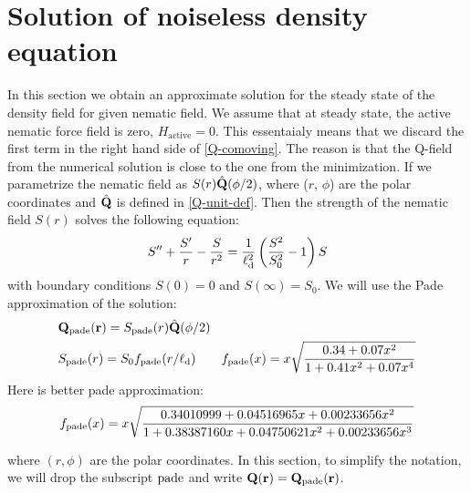 \documentclass[a5paper]{article}
\begin{document}
\section{Solution of noiseless density equation}
\label{sec:defect-steady-poisson}
In this section we obtain an approximate solution for the steady state of the density field for given nematic field. We assume that at steady state, the active nematic force field is zero, $H_\text{active} = 0$. This essentaialy means that we discard the first term in the right hand side of \cref{Q-comoving}. The reason is that the Q-field from the numerical solution is close to the one from the minimization.
If we parametrize the nematic field as $S(r) \hat{\mathbf{Q}}(\phi/2)$, where ($r$, $\phi$) are the polar coordinates and $\hat{\mathbf{Q}}$ is defined in \cref{Q-unit-def}.
Then the strength of the nematic field $S(r)$ solves the following equation:
\begin{align}
S''+\frac{S'}{r}-\frac{S}{r^2} = \frac{1}{\ell_{\rm d}^2}\left(\frac{S^2}{S_0^2}-1\right)S
\end{align}
with boundary conditions $S(0) = 0$ and $S(\infty) = S_0$.
We will use the Pade approximation of the solution:
\begin{align}
    &\mathbf{Q}_{\text{pade}}(\mathbf{r}) = S_{\text{pade}}(r) \hat{\mathbf{Q}}(\phi/2)
    \\
    &S_{\text{pade}}(r) = S_0 f_{\text{pade}}(r/\ell_{\rm d})  \qquad f_{\text{pade}}(x) = x \sqrt{\frac{0.34 + 0.07 x^2}{1 + 0.41 x^2+0.07 x^4}}
\end{align}
Here is better pade approximation:
\begin{align}
    f_{\text{pade}}(x) = x \sqrt{\frac{0.34010999 + 0.04516965 x + 0.00233656 x^2}{1 + 0.38387160 x + 0.04750621 x^2 + 0.00233656 x^3}}
\end{align}

where $(r, \phi)$ are the polar coordinates. In this section, to simplify the notation, we will drop the subscript $\text{pade}$ and write $\mathbf{Q}(\mathbf{r}) = \mathbf{Q}_{\text{pade}}(\mathbf{r})$.
\end{document}
